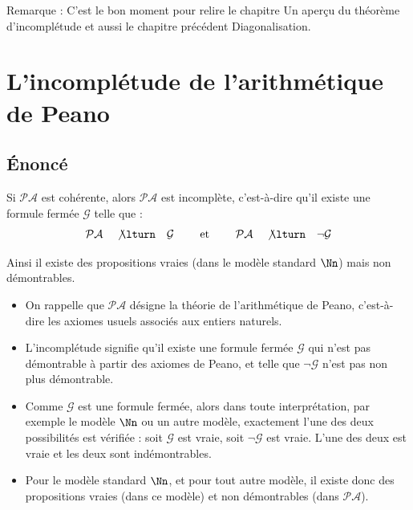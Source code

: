 \documentclass[11pt,class=report,crop=false]{standalone}
\begin{document}


Remarque : C'est le bon moment pour relire le chapitre \og{}Un aperçu du théorème d'incomplétude\fg{} et aussi le chapitre précédent \og{}Diagonalisation\fg{}.


\section{L'incomplétude de l'arithmétique de Peano}

\subsection{Énoncé}

\begin{theoreme}
Si $\mathcal{PA}$ est cohérente, alors $\mathcal{PA}$ est incomplète, c'est-à-dire qu'il existe une formule fermée $\mathcal{G}$ telle que :
\[
  \mathcal{PA} \quad \not\lturn \quad \mathcal{G} \qquad \text{ et } \qquad
  \mathcal{PA} \quad \not\lturn \quad \lnot \mathcal{G}
\]
\end{theoreme}

Ainsi il existe des propositions vraies (dans le modèle standard $\Nn$) mais non démontrables.

\begin{itemize}
    \item On rappelle que $\mathcal{PA}$ désigne la théorie de l'arithmétique de Peano, c'est-à-dire les axiomes usuels associés aux entiers naturels.
    
    \item L'incomplétude signifie qu'il existe une formule fermée $\mathcal{G}$ qui n'est pas démontrable à partir des axiomes de Peano, et telle que $\lnot\mathcal{G}$ n'est pas non plus démontrable.

    \item Comme $\mathcal{G}$ est une formule fermée, alors dans toute interprétation, par exemple le modèle $\Nn$ ou un autre modèle, exactement l'une des deux possibilités est vérifiée : soit $\mathcal{G}$ est vraie, soit $\lnot\mathcal{G}$ est vraie. L'une des deux est vraie et les deux sont indémontrables.
    
    \item Pour le modèle standard $\Nn$, et pour tout autre modèle, il existe donc des propositions vraies (dans ce modèle) et non démontrables (dans $\mathcal{PA}$).
\end{itemize}
\end{document}
